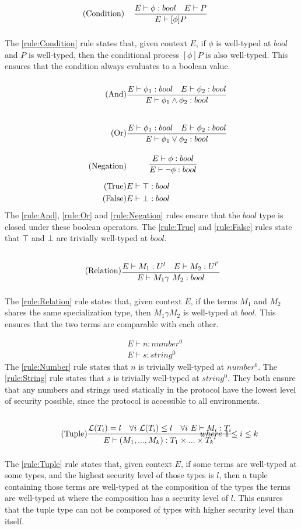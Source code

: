 \begin{align*}
\tag{Condition}\label{rule:Condition} &\infrule{E\vdash \phi:bool\quad E\vdash P}{E \vdash [\phi] P}
\end{align*}
The \ref{rule:Condition} rule states that, given context $E$, if $\phi$ is well-typed at $bool$ and $P$ is well-typed, then the conditional process $[\phi]P$ is also well-typed. This ensures that the condition always evaluates to a boolean value.
\begin{align*}
\tag{And}\label{rule:And} &\infrule{E\vdash \phi _1:bool \quad E\vdash \phi _2:bool}{E\vdash \phi _1 \land \phi _2:bool}\\
\tag{Or}\label{rule:Or} &\infrule{E\vdash \phi _1:bool \quad E\vdash \phi _2:bool}{E\vdash \phi _1 \lor \phi _2:bool}\\
\tag{Negation}\label{rule:Negation} &\infrule{E\vdash \phi :bool }{E\vdash \neg \phi :bool}\\
\tag{True}\label{rule:True} &E\vdash\top:bool\\
\tag{False}\label{rule:False} &E\vdash\bot:bool
\end{align*}
The \ref{rule:And}, \ref{rule:Or} and \ref{rule:Negation} rules ensure that the $bool$ type is closed under these boolean operators. The \ref{rule:True} and \ref{rule:False} rules state that $\top$ and $\bot$ are trivially well-typed at $bool$.

\begin{align*}
\tag{Relation}\label{rule:Relation} &\infrule{E\vdash M_1:U^l\quad E\vdash M_2:U^{l'}}{E\vdash M_1 \gamma\ M_2:bool}
\end{align*}
The \ref{rule:Relation} rule states that, given context $E$, if the terms $M_1$ and $M_2$ shares the same specialization type, then $M_1\gamma M_2$ is well-typed at $bool$. This ensures that the two terms are comparable with each other.

\begin{align*}
\tag{Number}\label{rule:Number} &E\vdash n:{number^0}\\
\tag{String}\label{rule:String} &E\vdash s:{string^0}
\end{align*}
The \ref{rule:Number} rule states that $n$ is trivially well-typed at $number^0$.
The \ref{rule:String} rule states that $s$ is trivially well-typed at $string^0$.
They both ensure that any numbers and strings used statically in the protocol have the lowest level of security possible, since the protocol is accessible to all environments.

\begin{align*}
\tag{Tuple}\label{rule:Tuple} &\infrule{\level{T_i}=l\quad\forall i\ \level{T_i}\leq l\quad\forall i\ E\vdash M_i:T_i}{E\vdash (M_1,...,M_k):{T_1\times...\times T_k}^l}& where\ 1\leq i\leq k
\end{align*}
The \ref{rule:Tuple} rule states that, given context $E$, if some terms are well-typed at some types, and the highest security level of those types is $l$, then a tuple containing those terms are well-typed at the composition of the types the terms are well-typed at where the composition has a security level of $l$.
This ensures that the tuple type can not be composed of types with higher security level than itself.

